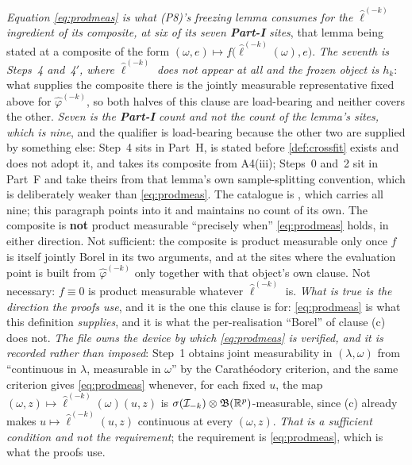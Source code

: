 \emph{Equation \eqref{eq:prodmeas} is what \textup{(P8)}'s freezing lemma consumes for the
$\hat\ell^{(-k)}$ \emph{ingredient} of its composite, at six of its seven \textbf{Part-I} sites}, that lemma being
stated at a composite of the form $(\omega,e)\mapsto f\big(\hat\ell^{(-k)}(\omega),e\big)$. \emph{The
seventh is  Steps~4 and~4$'$, where $\hat\ell^{(-k)}$ does not appear at all and the
frozen object is $h_k$}: what supplies the composite there is the jointly measurable representative fixed
above for $\hat\varphi^{(-k)}$, so both halves of this clause are load-bearing and neither covers the
other. \emph{Seven is the \textbf{Part-I} count and not the count of the lemma's sites, which is
nine}, and the qualifier is load-bearing because the other two are supplied by something else:
 Step~4 sits in Part~H, is stated before \cref{def:crossfit} exists and does
not adopt it, and takes its composite from A4(iii);  Steps~0 and~2 sit in
Part~F and take theirs from that lemma's own sample-splitting convention, which is deliberately
weaker than \eqref{eq:prodmeas}. The catalogue is , which carries all
nine; this paragraph points into it and maintains no count of its own. The composite is \textbf{not} product measurable ``precisely when'' \eqref{eq:prodmeas}
holds, in either direction. Not sufficient: the composite is product
measurable only once $f$ is itself jointly Borel in its two arguments, and at the sites where the
evaluation point is built from $\hat\varphi^{(-k)}$ only together with that object's own clause. Not
necessary: $f\equiv0$ is product measurable whatever $\hat\ell^{(-k)}$ is. \emph{What is true is the
direction the proofs use}, and it is the one this clause is for: \eqref{eq:prodmeas} is what this
definition \emph{supplies}, and it is what the per-realisation ``Borel'' of clause \textup{(c)} does not. \emph{The file owns the device by which \eqref{eq:prodmeas} is verified, and it
is recorded rather than imposed}:  Step~1 obtains joint measurability in
$(\lambda,\omega)$ from ``continuous in $\lambda$, measurable in $\omega$'' by the Carath\'eodory
criterion, and the same criterion gives \eqref{eq:prodmeas} whenever, for each fixed $u$, the map
$(\omega,z)\mapsto\hat\ell^{(-k)}(\omega)(u,z)$ is
$\sigma(\mathcal I_{-k})\otimes\mathfrak B(\mathbb{R}^{p})$-measurable, since \textup{(c)} already makes
$u\mapsto\hat\ell^{(-k)}(u,z)$ continuous at every $(\omega,z)$. \emph{That is a sufficient condition and
not the requirement}; the requirement is \eqref{eq:prodmeas}, which is what the proofs use.

